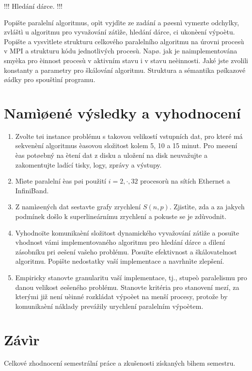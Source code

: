 \documentclass[12pt]{article}
\begin{document}
!!! Hledání dárce. !!!

Popište paralelní algoritmus, opìt vyjdìte ze zadání a pøesnì
vymezte odchylky, zvláštì u algoritmu pro vyvažování zátìže, hledání
dárce, ci ukonèení výpoètu.  Popište a vysvìtlete strukturu
celkového paralelního algoritmu na úrovni procesù v MPI a strukturu
kódu jednotlivých procesù. Napø. jak je naimplementována smyèka pro
èinnost procesù v aktivním stavu i v stavu neèinnosti. Jaké jste
zvolili konstanty a parametry pro škálování algoritmu. Struktura a
sémantika pøíkazové øádky pro spouštìní programu.

\section{Namìøené výsledky a vyhodnocení}

\begin{enumerate}
\item Zvolte tøi instance problému s takovou velikostí vstupních dat, pro které má
sekvenèní algoritmus èasovou složitost kolem 5, 10 a 15 minut. Pro
meøení èas potøebný na ètení dat z disku a uložení na disk
neuvažujte a zakomentujte ladící tisky, logy, zprávy a výstupy.
\item Mìøte paralelní èas pøi použití $i=2,\cdot,32$ procesorù na sítích Ethernet a InfiniBand.
\item Z namìøených dat sestavte grafy zrychlení $S(n,p)$. Zjistìte, zda a za jakych podmínek
došlo k superlineárnímu zrychlení a pokuste se je zdùvodnit.
\item Vyhodnoïte komunikaèní složitost dynamického vyvažování zátìže a posuïte
vhodnost vámi implementovaného algoritmu pro hledání dárce a dìlení
zásobníku pri øešení vašeho problému. Posuïte efektivnost a
škálovatelnost algoritmu. Popište nedostatky vaší implementace a
navrhnìte zlepšení.
\item Empiricky stanovte
granularitu vaší implementace, tj., stupeò paralelismu pro danou
velikost øešeného problému. Stanovte kritéria pro stanovení mezí, za
kterými již není uèinné rozkládat výpoèet na menší procesy, protože
by komunikaèní náklady prevážily urychlení paralelním výpoètem.

\end{enumerate}

\section{Závìr}

Celkové zhodnocení semestrální práce a zkušenosti získaných bìhem
semestru.
\end{document}

